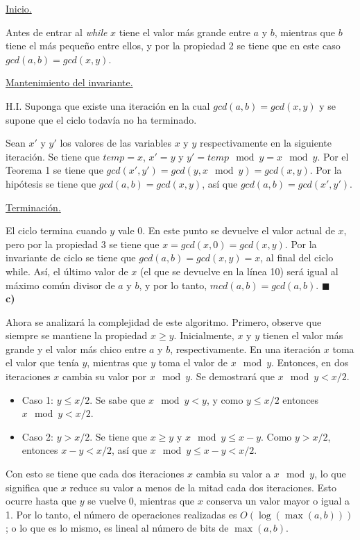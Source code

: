 \documentclass{article}
\begin{document}
\underline{Inicio.}

Antes de entrar al \textit{while} $x$ tiene el valor más grande entre $a$ y $b$, mientras que $b$ tiene el más pequeño entre ellos, y por la propiedad 2 se tiene que en este caso $gcd(a, b) = gcd(x, y)$.

\underline{Mantenimiento del invariante.} 

H.I. Suponga que existe una iteración en la cual $gcd(a, b) = gcd(x, y)$ y se supone que el ciclo todavía no ha terminado.

Sean $x'$ y $y'$ los valores de las variables $x$ y $y$ respectivamente en la siguiente iteración. Se tiene que $temp = x$, $x' = y$ y $y' = temp \mod y = x \mod y$. Por el Teorema 1 se tiene que $gcd(x', y') = gcd(y, x \mod y) = gcd(x, y)$. Por la hipótesis se tiene que $gcd(a, b) = gcd(x, y)$, así que $gcd(a, b) = gcd(x', y')$.

\underline{Terminación.}

El ciclo termina cuando $y$ vale 0. En este punto se devuelve el valor actual de $x$, pero por la propiedad 3 se tiene que $x = gcd(x, 0) = gcd(x, y)$. Por la invariante de ciclo se tiene que $gcd(a, b) = gcd(x, y) = x$, al final del ciclo while. Así, el último valor de $x$ (el que se devuelve en la línea 10) será igual al máximo común divisor de $a$ y $b$, y por lo tanto, $mcd(a, b) = gcd(a, b)$. $\blacksquare$\\

\textbf{c)}

Ahora se analizará la complejidad de este algoritmo. Primero, observe que siempre se mantiene la propiedad $x \geq y$. Inicialmente, $x$ y $y$ tienen el valor más grande y el valor más chico entre $a$ y $b$, respectivamente. En una iteración $x$ toma el valor que tenía $y$, mientras que $y$ toma el valor de $x \mod y$. Entonces, en dos iteraciones $x$ cambia su valor por $x \mod y$. Se demostrará que $x \mod y < x/2$.

\begin{itemize}
\item Caso 1: $y \leq x/2$. Se sabe que $x \mod y < y$, y como $y \leq x/2$ entonces $x \mod y < x/2$.
\item Caso 2: $y > x/2$. Se tiene que $x \geq y$ y $x \mod y \leq x-y$. Como $y > x/2$, entonces $x - y < x/2$, así que $x \mod y \leq x-y < x/2$.
\end{itemize}

Con esto se tiene que cada dos iteraciones $x$ cambia su valor a $x \mod y$, lo que significa que $x$ reduce su valor a menos de la mitad cada dos iteraciones. Esto ocurre hasta que $y$ se vuelve 0, mientras que $x$ conserva un valor mayor o igual a 1. Por lo tanto, el número de operaciones realizadas es $O(\log (\max (a, b)))$; o lo que es lo mismo, es lineal al número de bits de $\max (a, b)$.\\
\end{document}
